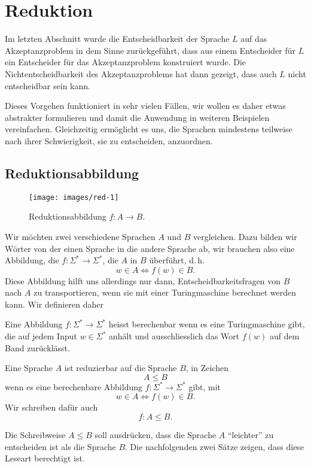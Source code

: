 \section{Reduktion}
%
Im letzten Abschnitt wurde die Entscheidbarkeit der Sprache $L$
auf das Akzeptanzproblem in dem Sinne zurückgeführt, dass
aus einem Entscheider für $L$ ein Entscheider für das Akzeptanzproblem
konstruiert wurde.
Die Nichtentscheidbarkeit des Akzeptanzproblems
hat dann gezeigt, dass auch $L$ nicht entscheidbar sein kann.

Dieses Vorgehen funktioniert in sehr vielen Fällen, wir wollen es
daher etwas abstrakter formulieren und damit die Anwendung in weiteren
Beispielen vereinfachen.
Gleichzeitig ermöglicht es uns, die
Sprachen mindestens teilweise nach ihrer Schwierigkeit, sie zu entscheiden,
anzuordnen.

\subsection{Reduktionsabbildung}
%
\begin{figure}
\begin{center}
\texttt{[image: images/red-1]}
\end{center}
\caption{Reduktionsabbildung $f\colon A\to B$.\label{reduktionsabbildung}}
\end{figure}
Wir möchten zwei verschiedene Sprachen 
$A$ und $B$ 
vergleichen.
Dazu bilden wir Wörter von der einen Sprache in
die andere Sprache ab, wir brauchen also eine Abbildung, die
$f\colon\Sigma^*\to \Sigma^*$, die $A$ in $B$ überführt,
d.\,h.
\[
w\in A\Leftrightarrow f(w)\in B.
\]
Diese Abbildung hilft uns allerdings nur dann, Entscheidbarkeitsfragen
von $B$ nach $A$ zu transportieren, wenn sie mit einer Turingmaschine
berechnet werden kann.
Wir definieren daher

\begin{definition}
%
Eine Abbildung $f\colon \Sigma^*\to \Sigma^*$ heisst berechenbar wenn es eine
Turingmaschine gibt, die auf jedem Input $w\in \Sigma^*$ anhält
und ausschliesslich das Wort $f(w)$ auf dem Band zurücklässt.
\end{definition}

\begin{definition}
%
Eine Sprache $A$ ist reduzierbar auf die Sprache $B$, in Zeichen
\[
A\le B
\]
wenn es eine
berechenbare Abbildung $f\colon \Sigma^*\to \Sigma^*$ gibt, mit
\[
w\in A\Leftrightarrow f(w)\in B.
\]
Wir schreiben dafür auch
\[
f\colon A\le B.
\]
\end{definition}
Die Schreibweise $A\le B$ soll ausdrücken, dass die Sprache $A$ ``leichter''
zu entscheiden ist als die Sprache $B$.
Die nachfolgenden zwei Sätze
zeigen, dass diese Leseart berechtigt ist.

